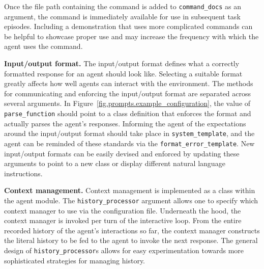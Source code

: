 Once the file path containing the command is added to \texttt{command\_docs} as an argument, the command is immediately available for use in subsequent task episodes.
Including a demonstration that uses more complicated commands can be helpful to showcase proper use and may increase the frequency with which the agent uses the command.

\textbf{Input/output format.}
The input/output format defines what a correctly formatted response for an agent should look like.
Selecting a suitable format greatly affects how well agents can interact with the environment.
The methods for communicating and enforcing the input/output format are separated across several arguments.
In Figure~\ref{fig.prompts.example_configuration}, the value of \texttt{parse\_function} should point to a class definition that enforces the format and actually parses the agent's responses.
Informing the agent of the expectations around the input/output format should take place in \texttt{system\_template}, and the agent can be reminded of these standards via the \texttt{format\_error\_template}.
New input/output formats can be easily devised and enforced by updating these arguments to point to a new class or display different natural language instructions.

\textbf{Context management.}
Context management is implemented as a class within the agent module.
The \texttt{history\_processor} argument allows one to specify which context manager to use via the configuration file.
Underneath the hood, the context manager is invoked per turn of the interactive loop.
From the entire recorded history of the agent's interactions so far, the context manager constructs the literal history to be fed to the agent to invoke the next response.
The general design of \texttt{history\_processor}s allows for easy experimentation towards more sophisticated strategies for managing history.
